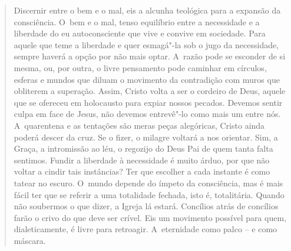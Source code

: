 {\begin{quote}
Discernir entre o bem e o mal, eis a alcunha teológica para a expansão
da consciência. O~bem e o mal, tenso equilíbrio entre a necessidade e a
liberdade do eu autoconsciente que vive e convive em sociedade. Para
aquele que teme a liberdade e quer esmagá"-la sob o jugo da necessidade,
sempre haverá a opção por não mais optar. A~razão pode se esconder de si
mesma, ou, por outra, o livre pensamento pode caminhar em círculos,
esferas e mundos que diluam o movimento da contradição com muros que
obliterem a superação. Assim, Cristo volta a ser o cordeiro de Deus,
aquele que se ofereceu em holocausto para expiar nossos pecados. Devemos
sentir culpa em face de Jesus, não devemos entrevê"-lo como mais um entre
nós. A~quarentena e as tentações são meras peças alegóricas, Cristo
ainda poderá descer da cruz. Se o fizer, o milagre voltará a nos
orientar. Sim, a Graça, a intromissão ao léu, o regozijo do Deus Pai de
quem tanta falta sentimos. Fundir a liberdade à necessidade é muito
árduo, por que não voltar a cindir tais instâncias? Ter que escolher a
cada instante é como tatear no escuro. O~mundo depende do ímpeto da
consciência, mas é mais fácil ter que se referir a uma totalidade
fechada, isto é, totalitária. Quando não soubermos o que dizer, a Igreja
lá estará. Concílios atrás de concílios farão o crivo do que deve ser
crível. Eis um movimento possível para quem, dialeticamente, é livre
para retroagir. A~eternidade como palco -- e como máscara.


\end{quote}}
